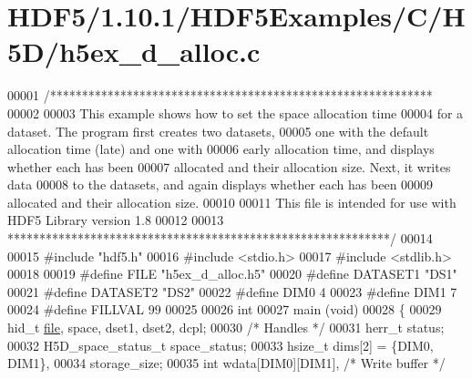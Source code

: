 \hypertarget{_h_d_f5_21_810_81_2_h_d_f5_examples_2_c_2_h5_d_2h5ex__d__alloc_8c_source}{}\section{H\+D\+F5/1.10.1/\+H\+D\+F5\+Examples/\+C/\+H5\+D/h5ex\+\_\+d\+\_\+alloc.c}
\label{_h_d_f5_21_810_81_2_h_d_f5_examples_2_c_2_h5_d_2h5ex__d__alloc_8c_source}

\begin{DoxyCode}
00001 \textcolor{comment}{/************************************************************}
00002 \textcolor{comment}{}
00003 \textcolor{comment}{  This example shows how to set the space allocation time}
00004 \textcolor{comment}{  for a dataset.  The program first creates two datasets,}
00005 \textcolor{comment}{  one with the default allocation time (late) and one with}
00006 \textcolor{comment}{  early allocation time, and displays whether each has been}
00007 \textcolor{comment}{  allocated and their allocation size.  Next, it writes data}
00008 \textcolor{comment}{  to the datasets, and again displays whether each has been}
00009 \textcolor{comment}{  allocated and their allocation size.}
00010 \textcolor{comment}{}
00011 \textcolor{comment}{  This file is intended for use with HDF5 Library version 1.8}
00012 \textcolor{comment}{}
00013 \textcolor{comment}{ ************************************************************/}
00014 
00015 \textcolor{preprocessor}{#include "hdf5.h"}
00016 \textcolor{preprocessor}{#include <stdio.h>}
00017 \textcolor{preprocessor}{#include <stdlib.h>}
00018 
00019 \textcolor{preprocessor}{#define FILE            "h5ex\_d\_alloc.h5"}
00020 \textcolor{preprocessor}{#define DATASET1        "DS1"}
00021 \textcolor{preprocessor}{#define DATASET2        "DS2"}
00022 \textcolor{preprocessor}{#define DIM0            4}
00023 \textcolor{preprocessor}{#define DIM1            7}
00024 \textcolor{preprocessor}{#define FILLVAL         99}
00025 
00026 \textcolor{keywordtype}{int}
00027 main (\textcolor{keywordtype}{void})
00028 \{
00029     hid\_t                   \hyperlink{structfile}{file}, space, dset1, dset2, dcpl;
00030                                                     \textcolor{comment}{/* Handles */}
00031     herr\_t                  status;
00032     H5D\_space\_status\_t      space\_status;
00033     hsize\_t                 dims[2] = \{DIM0, DIM1\},
00034                             storage\_size;
00035     \textcolor{keywordtype}{int}                     wdata[DIM0][DIM1],      \textcolor{comment}{/* Write buffer */}

\end{DoxyCode}

